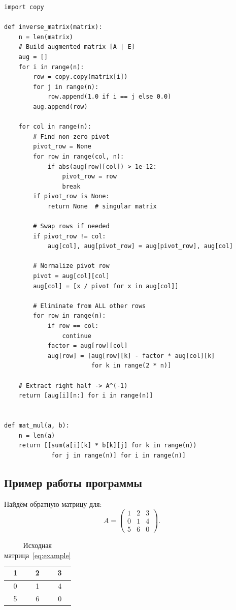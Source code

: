 \documentclass[12pt,a4paper]{scrartcl}
\begin{document}
\begin{lstlisting}[caption={inverse\_matrix.py --- ключевые функции}]
import copy

def inverse_matrix(matrix):
    n = len(matrix)
    # Build augmented matrix [A | E]
    aug = []
    for i in range(n):
        row = copy.copy(matrix[i])
        for j in range(n):
            row.append(1.0 if i == j else 0.0)
        aug.append(row)

    for col in range(n):
        # Find non-zero pivot
        pivot_row = None
        for row in range(col, n):
            if abs(aug[row][col]) > 1e-12:
                pivot_row = row
                break
        if pivot_row is None:
            return None  # singular matrix

        # Swap rows if needed
        if pivot_row != col:
            aug[col], aug[pivot_row] = aug[pivot_row], aug[col]

        # Normalize pivot row
        pivot = aug[col][col]
        aug[col] = [x / pivot for x in aug[col]]

        # Eliminate from ALL other rows
        for row in range(n):
            if row == col:
                continue
            factor = aug[row][col]
            aug[row] = [aug[row][k] - factor * aug[col][k]
                        for k in range(2 * n)]

    # Extract right half -> A^(-1)
    return [aug[i][n:] for i in range(n)]


def mat_mul(a, b):
    n = len(a)
    return [[sum(a[i][k] * b[k][j] for k in range(n))
             for j in range(n)] for i in range(n)]
\end{lstlisting}

\subsection{Пример работы программы}

Найдём обратную матрицу для:
\begin{equation}
    A =
    \begin{pmatrix}
        1 & 2 & 3 \\
        0 & 1 & 4 \\
        5 & 6 & 0
    \end{pmatrix}.
    \label{eq:example}
\end{equation}

\begin{table}[h]
    \centering
    \caption{Исходная матрица~\eqref{eq:example}}
    \label{tab:input}
    \begin{tabular}{|c|c|c|}
        \hline
        1 & 2 & 3 \\
        \hline
        0 & 1 & 4 \\
        \hline
        5 & 6 & 0 \\
        \hline
    \end{tabular}
\end{table}
\end{document}
